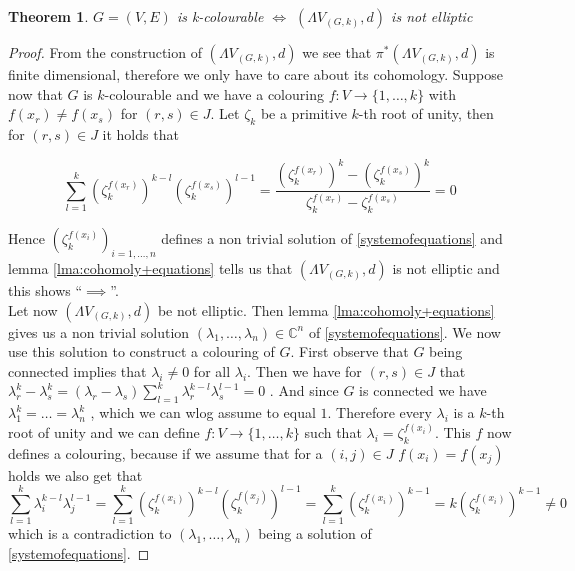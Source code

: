 \documentclass[12pt,a4paper]{scrartcl}
\newtheorem{Theorem}{Theorem}[section]
\numberwithin{equation}{section}
\newcommand{\C}{\mathbb{C}} %
\begin{document}
 \begin{Theorem}
   $G = (V,E)$ is k-colourable $\iff$ $(\Lambda V_{(G,k)},d)$ is not elliptic
 \end{Theorem}

 \begin{proof}
  From the construction of $(\Lambda V_{(G,k)},d)$ we see that  $\pi^*(\Lambda V_{(G,k)},d)$ is finite dimensional, therefore
  we only have to care about its cohomology. Suppose now that $G$ is $k$-colourable and we have a colouring
  $f \colon V \to { \lbrace 1, \dotsc , k \rbrace }$ with $f(x_r) \neq f(x_s)$ for $(r,s) \in J$. Let $\zeta_k$ be a primitive 
  $k$-th root of unity, then for $(r,s) \in J$ it holds that
  
  $$ \sum_{l = 1}^k (\zeta_k^{f(x_r)})^{k-l} (\zeta_k^{f(x_s)})^{l-1}
  = \frac{(\zeta_k^{f(x_r)})^{k} - (\zeta_k^{f(x_s)})^{k}}{ \zeta_k^{f(x_r)} - \zeta_k^{f(x_s)}} = 0
  $$
  
  Hence $(\zeta_k^{f(x_i)})_{i = 1, \dotsc, n}$ defines a non trivial solution of \ref{systemofequations}
  and lemma \ref{lma:cohomoly+equations} tells us that $(\Lambda V_{(G,k)},d)$ is not elliptic and this shows
  ``$\implies$''. \\
  Let now $(\Lambda V_{(G,k)},d)$ be not elliptic. Then lemma \ref{lma:cohomoly+equations} gives us a non trivial
  solution $(\lambda_1 , \dotsc, \lambda_n) \in \C^n$ of \ref{systemofequations}. We now use this solution to construct
  a colouring of $G$. First observe that $G$ being connected implies that $\lambda_i \neq 0$ for all $\lambda_i$. Then we have
  for $(r,s) \in J$ that $ \lambda_r^k - \lambda_s^k = ( \lambda_r - \lambda_s) 
  \sum_{l = 1}^k \lambda_r^{k - l} \lambda_s^{l - 1} = 0$ . And since $G$ is connected we have 
  $\lambda_1^k = \dotsc = \lambda_n^k$ , which we can wlog assume to equal $1$. Therefore every $\lambda_i$ is a 
  $k$-th root of unity and we can define $f \colon V \to { \lbrace 1, \dotsc , k \rbrace }$ such that 
  $\lambda_i = \zeta_k^{f(x_i)}$. This $f$ now defines a colouring, because if we assume that for a $(i,j) \in J$
  $f(x_i) = f(x_j)$ holds we also get that 
  $$\sum_{l = 1}^k \lambda_i^{k - l} \lambda_j^{l - 1} = \sum_{l = 1}^k (\zeta_k^{f(x_i)})^{k-l} (\zeta_k^{f(x_j)})^{l-1}
  = \sum_{l = 1}^k (\zeta_k^{f(x_i)})^{k-1} = k (\zeta_k^{f(x_i)})^{k-1} \neq 0$$ 
  which is a contradiction to $(\lambda_1 , \dotsc, \lambda_n)$ being a solution of \ref{systemofequations}.
  
 \end{proof}
\end{document}
